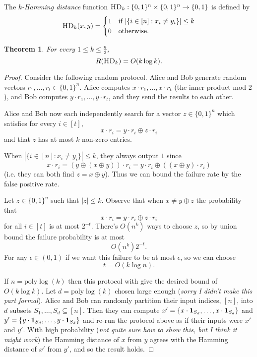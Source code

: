 \documentclass[11pt]{amsart}
\theoremstyle{plain}
\newtheorem{theorem}{Theorem}
\theoremstyle{definition}
\theoremstyle{plain}
\newcommand{\HD}{\textsc{HD}}
\begin{document}
The \emph{$k$-Hamming distance} function $\HD_k : \{0,1\}^n \times \{0,1\}^n \to \{0,1\}$ is defined by
\[
\HD_k(x,y) = \begin{cases}
1 & \mbox{if } |\{i \in [n] : x_i \neq y_i\}| \le k \\
0 & \mbox{otherwise.}
\end{cases}
\]

\begin{theorem}
For every $1 \le k \le \frac n2$,
\[
R(\HD_k) = O( k \log k).
\]
\end{theorem}

\begin{proof}
Consider the following random protocol. Alice and Bob generate random vectors $r_1, \dots, r_t \in \{0,1\}^n.$ Alice computes $x\cdot r_1, \dots, x\cdot r_t$ (the inner product mod $2$), and Bob computes $y\cdot r_1, \dots, y \cdot r_t$, and they send the results to each other.

Alice and Bob now each independently search for a vector $z \in \{0,1\}^n$ which satisfies for every $i\in[t]$,
$$x\cdot r_i = y\cdot r_i \oplus z \cdot r_i$$
and that $z$ has at most $k$ non-zero entries.

When $|\{i \in [n]: x_i \neq y_i\}| \leq k$, they always output $1$ since 
$$x\cdot r_i = (y \oplus (x\oplus y)) \cdot r_i = y\cdot r_i \oplus((x\oplus y) \cdot r_i) $$ 
(i.e. they can both find $z= x\oplus y$). Thus we can bound the failure rate by the false positive rate.

Let $z \in \{0,1\}^n$ such that $|z| \leq k$. Observe that when $x \neq y \oplus z$ the probability that 
$$x\cdot r_i = y\cdot r_i \oplus z\cdot r_i$$
for all $i \in [t]$ is at most $2^{-t}$. There's $O(n^k)$ ways to choose $z$, so by union bound the failure probability is at most
$$O(n^k)2^{-t}.$$
For any $\epsilon \in (0,1)$ if we want this failure to be at most $\epsilon$, so we can choose
$$t = O(k \log n).$$

If $n = \text{poly}\log(k)$ then this protocol with give the desired bound of $O(k \log k)$. Let $d = \text{poly}\log(k)$ chosen large enough (\emph{sorry I didn't make this part formal}). Alice and Bob can randomly partition their input indices, $[n]$, into $d$ subsets $S_1, \dots, S_d\subseteq [n]$. Then they can compute $x'=\{x\cdot \bold{1}_{S_d},\dots, x\cdot \bold{1}_{S_d}\}$ and $y'=\{y\cdot \bold{1}_{S_d},\dots, y\cdot \bold{1}_{S_d}\}$ and re-run the protocol above as if their inputs were $x'$ and $y'$. With high probability (\emph{not quite sure how to show this, but I think it might work}) the Hamming distance of $x$ from $y$ agrees with the Hamming distance of $x'$ from $y'$, and so the result holds.
\end{proof}
\end{document}
